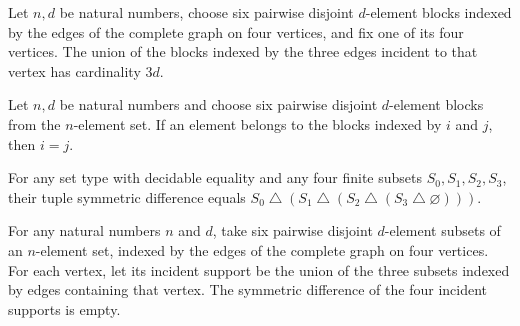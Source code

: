 \begin{theorem}
\label{FABL.SixDisjointBlockChoice.incidentSupport_card}
\leanok
{}
Let $n,d$ be natural numbers, choose six pairwise disjoint $d$-element blocks indexed by
the edges of the complete graph on four vertices, and fix one of its four vertices. The
union of the blocks indexed by the three edges incident to that vertex has cardinality
$3d$.
\end{theorem}

\begin{theorem}
\label{FABL.SixDisjointBlockChoice.eq_of_mem_blocks}
\leanok
{}
Let $n,d$ be natural numbers and choose six pairwise disjoint $d$-element blocks from
the $n$-element set. If an element belongs to the blocks indexed by $i$ and $j$, then
$i=j$.
\end{theorem}

\begin{theorem}
\label{FABL.tupleSymmDiff_finFour}
\leanok
{}
For any set type with decidable equality and any four finite subsets $S_0,S_1,S_2,S_3$,
their tuple symmetric difference equals
$S_0\mathbin{\triangle}(S_1\mathbin{\triangle}(S_2\mathbin{\triangle}(S_3\mathbin{\triangle}\varnothing)))$.
\end{theorem}

\begin{theorem}
\label{FABL.SixDisjointBlockChoice.tupleSymmDiff_incidentSupport}
\leanok
{}
For any natural numbers $n$ and $d$, take six pairwise disjoint $d$-element subsets of
an $n$-element set, indexed by the edges of the complete graph on four vertices. For
each vertex, let its incident support be the union of the three subsets indexed by edges
containing that vertex. The symmetric difference of the four incident supports is empty.
\end{theorem}

